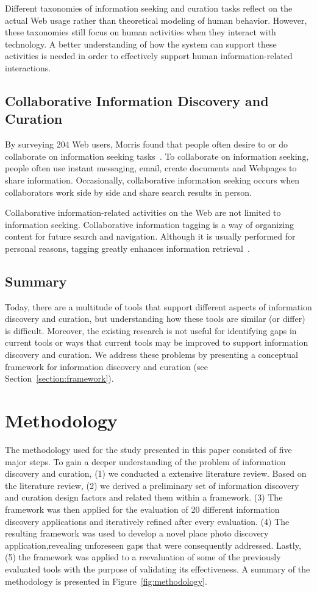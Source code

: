 \documentclass{sigchi}
\begin{document}
Different taxonomies of information seeking and curation tasks reflect on the actual Web usage rather than theoretical modeling of human behavior. However, these taxonomies still focus on human activities when they interact with technology. A better understanding of how the system can support these activities is needed in order to effectively support human information-related interactions. 

\subsection{Collaborative Information Discovery and Curation}
By surveying 204 Web users, Morris found that people often desire to or do collaborate on information seeking tasks~\cite{morris2008survey}. To collaborate on information seeking, people often use instant messaging, email, create documents and Webpages to share information. Occasionally, collaborative information seeking occurs when collaborators work side by side and share search results in person.

Collaborative information-related activities on the Web are not limited to information seeking. Collaborative information tagging is a way of organizing content for future search and navigation. Although it is usually performed for personal reasons, tagging greatly enhances information retrieval~\cite{golder2006usage}.

\subsection{Summary}
Today, there are a multitude of tools that support different aspects of information discovery and curation, but understanding how these tools are similar (or differ) is difficult. Moreover, the existing research is not useful for identifying gaps in current tools or ways that current tools may be improved to support information discovery and curation. We address these problems by presenting a conceptual framework for information discovery and curation (see Section~\ref{section:framework}).

\section{Methodology}
The methodology used for the study presented in this paper consisted of five major steps. To gain a deeper understanding of the problem of information discovery and curation, (1) we conducted a extensive literature review. Based on the literature review, (2) we derived a preliminary set of information discovery and curation design factors and related them within a framework. (3) The framework was then applied for the evaluation of 20 different information discovery applications and iteratively refined after every evaluation. (4) The resulting framework was used to develop a novel place photo discovery application,revealing unforeseen gaps that were consequently addressed. Lastly, (5) the framework was applied to a reevaluation of some of the previously evaluated tools with the purpose of validating its effectiveness.  A summary of the methodology is presented in Figure~\ref{fig:methodology}.
\end{document}
